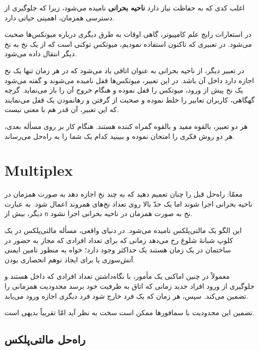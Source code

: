\documentclass{book}
\newcommand{\clearemptydoublepage}{}%
\begin{document}
    اغلب کدی که به حفاظت نیاز دارد \textbf{ناحیه بحرانی} نامیده می‌شود، 
    زیرا که جلوگیری از دسترسی همزمان، اهمیتی حیاتی دارد. 

    در استعارات رایج علم کامپیوتر، گاهی اوقات به طرق دیگری درباره میوتکس‌ها صحبت می‌شود. 
    در تعبیری که تاکنون استفاده نمودیم،  میوتکس‌ توکنی است که از یک نخ به نخ دیگر انتقال داده می‌شود. 

    در تعبیر دیگر، از ناحیه بحرانی به عنوان اتاقی یاد می‌شود که در هر زمان تنها یک نخ اجازه دارد داخل آن باشد. 
    در این تعبیر،  میوتکس‌ها قفل نامیده می‌شوند و گفته می‌شود یک نخ پیش از ورود،  میوتکس‌ را قفل نموده 
    و هنگام خروج آن را باز می‌نماید. گرچه گهگاهی، کاربران تعابیر را خلط نموده و صحبت از  گرفتن 
    و رهانمودن یک قفل می‌نمایند که این تعبیر، آن قدر هم با معنی نیست. 

    هر دو تعبیر، بالقوه مفید و بالقوه گمراه کننده هستند. 
    هنگام کار بر روی مسأله بعدی،‌ هر دو روش فکری را امتحان نموده و ببینید کدام یک شما را به راه‌حل می‌رساند.

\section{Multiplex}
    
    معمّا: راه‌حل قبل را چنان تعمیم دهید که به چند نخ اجازه دهد به صورت همزمان در ناحیه بحرانی اجرا شوند اما یک حدّ بالا روی تعداد 
    نخ‌های همروند اعمال شود. به عبارت دیگر، بیش از \texttt{n} نخ به صورت همزمان در ناحیه بحرانی اجرا نشود. 
    
    این  الگو یک مالتی‌پلکس نامیده می‌شود. در دنیای واقعی، مسأله مالتی‌پلکس در یک کلوپ شبانهٔ شلوغ
    رخ می‌دهد زمانی که برای تعداد افرادی که مجاز به حضور در ساختمان در یک زمان هستند یک حداکثر وجود دارد؛ خواه به منظور تامین ایمنی آتش‌سوزی
    یا برای ایجاد توهم انحصاری بودن.

    معمولاً در چنین اماکنی یک مأمور،  با نگاه‌داشتن تعداد افرادی که داخل هستند و 
    جلوگیری از ورود افراد جدید زمانی که اتاق به ظرفیت خود برسد محدودیت همزمانی را تضمین می‌کند.
    سپس، هر زمان که یک فرد خارج شود فرد دیگری اجازه ورود می‌یابد. 

    تضمین این محدودیت با سمافورها ممکن است سخت به نظر آید امّا تقریباً بدیهی است. 


\clearemptydoublepage
\subsection{ راه‌حل مالتی‌پلکس}
\end{document}

